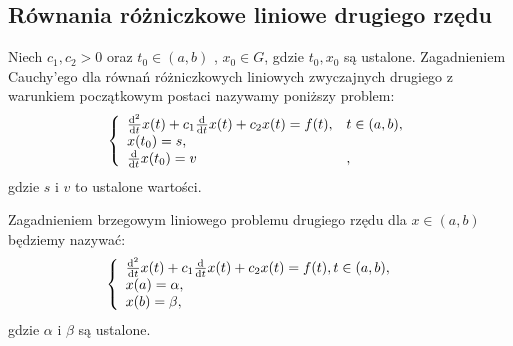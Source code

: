 \documentclass[12pt,a4paper]{report}
\begin{document}
\subsection{Równania różniczkowe liniowe drugiego rzędu }
\begin{problem}
Niech $c_1 , c_2 >0 $ oraz $t_0 \in (a,b) $ , $ x_0 \in G $, gdzie $t_0, x_0$ są ustalone.
Zagadnieniem Cauchy'ego dla równań różniczkowych liniowych zwyczajnych drugiego z warunkiem początkowym postaci nazywamy poniższy problem:
\begin{equation}
\left\{\begin{array}{ll}
\ddx [^2]{t} x(t) + c_1\ddx{t} x(t) + c_2x(t) = f(t), & t \in (a,b),\\
x(t_0) = s ,& \\
\ddx{t} x(t_0) = v &,
\end{array} \right.
\end{equation}
gdzie $ s$ i $v$ to ustalone wartości.
\end{problem}

\begin{problem}
Zagadnieniem brzegowym liniowego problemu drugiego rzędu dla $ x \in (a,b) $ będziemy nazywać:
\begin{equation}
\left\{\begin{array}{ll}
\ddx [^2]{t} x(t) + c_1\ddx{t} x(t) + c_2x(t) = f(t), t \in (a,b), & \\
x(a) = \alpha, & \\
x(b) = \beta ,&
\end{array} \right.
\end{equation}
gdzie $\alpha$ i $\beta$ są ustalone. 
\end{problem}
\end{document}
